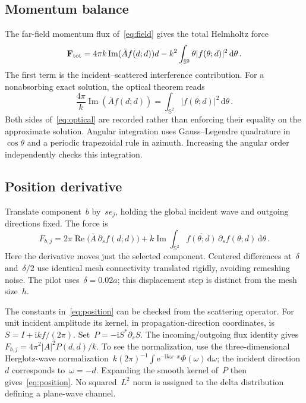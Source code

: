 \documentclass[11pt,a4paper]{article}
\numberwithin{equation}{section}
\newcommand{\dd}{\,\mathrm d}
\newcommand{\ii}{\mathrm i}
\newcommand{\Rea}{\operatorname{Re}}
\newcommand{\Ima}{\operatorname{Im}}
\begin{document}
\subsection{Momentum balance}
The far-field momentum flux of~\eqref{eq:field} gives the total Helmholtz force
\begin{equation}\label{eq:momentum}
 \mathbf F_{\rm tot}=4\pi k\Ima(\bar A f(d;d))d
    -k^2\int_{\mathbb S^2}\theta|f(\theta;d)|^2\dd\theta\,.
\end{equation}
The first term is the incident--scattered interference contribution. For a nonabsorbing exact solution, the optical theorem reads
\begin{equation}\label{eq:optical}
 \frac{4\pi}k\Ima(\bar A f(d;d))
    =\int_{\mathbb S^2}|f(\theta;d)|^2\dd\theta\,.
\end{equation}
Both sides of~\eqref{eq:optical} are recorded rather than enforcing their equality on the approximate solution. Angular integration uses Gauss--Legendre quadrature in~$\cos\theta$ and a periodic trapezoidal rule in azimuth. Increasing the angular order independently checks this integration.

\subsection{Position derivative}
Translate component~$b$ by~$s e_j$, holding the global incident wave and outgoing directions fixed. The force is
\begin{equation}\label{eq:position}
 F_{b,j}=2\pi\Rea\bigl(\bar A\,\partial_s f(d;d)\bigr)
    +k\Ima\int_{\mathbb S^2}\overline{f(\theta;d)}\,
                              \partial_s f(\theta;d)\dd\theta\,.
\end{equation}
Here the derivative moves just the selected component. Centered differences at~$\delta$ and~$\delta/2$ use identical mesh connectivity translated rigidly, avoiding remeshing noise. The pilot uses~$\delta=0.02a$; this displacement step is distinct from the mesh size~$h$.

The constants in~\eqref{eq:position} can be checked from the scattering operator. For unit incident amplitude its kernel, in propagation-direction coordinates, is~$S=I+\ii kf/(2\pi)$. Set~$P=-\ii S^*\partial_sS$. The incoming/outgoing flux identity gives~$F_{b,j}=4\pi^2|A|^2P(d,d)/k$. To see the normalization, use the three-dimensional Herglotz-wave normalization~$k(2\pi)^{-1}\int\mathrm e^{-\ii k\omega\cdot x}\Phi(\omega)\dd\omega$; the incident direction~$d$ corresponds to~$\omega=-d$. Expanding the smooth kernel of~$P$ then gives~\eqref{eq:position}. No squared~$L^2$ norm is assigned to the delta distribution defining a plane-wave channel.
\end{document}
